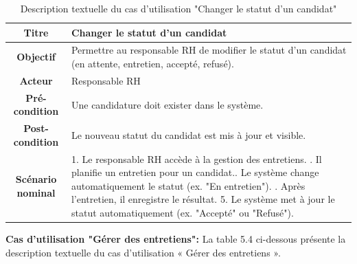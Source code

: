  \begin{table}[H]
 \caption{ Description textuelle du cas d’utilisation "Changer le statut d'un candidat"}
    \centering
    \begin{tabular}{|c|p{12cm}|}
    \hline
    \textbf{Titre} & Changer le statut d'un candidat \\
    \hline
    \textbf{Objectif} & Permettre au responsable RH de modifier le statut d’un candidat (en attente, entretien, accepté, refusé). \\
    \hline
    \textbf{Acteur}& Responsable RH\\
    \hline
    \textbf{Pré-condition} & Une candidature doit exister dans le système.
    \\
    \hline
    \textbf{Post-condition} & Le nouveau statut du candidat est mis à jour et visible.\\
    \hline
    \textbf{Scénario nominal} & 1. Le responsable RH accède à la gestion des entretiens. \newline
    2. Il planifie un entretien pour un candidat.\newline
    3. Le système change automatiquement le statut (ex. "En entretien").
    \newline
    4. Après l’entretien, il enregistre le résultat.
    5. Le système met à jour le statut automatiquement (ex. "Accepté" ou "Refusé").\\
    \hline
    \end{tabular}
    \label{tab:user_stories}
\end{table}

     \item \textbf{Cas d'utilisation "Gérer des entretiens": } La table 5.4 ci-dessous présente la description textuelle du cas d'utilisation « Gérer des entretiens ».

